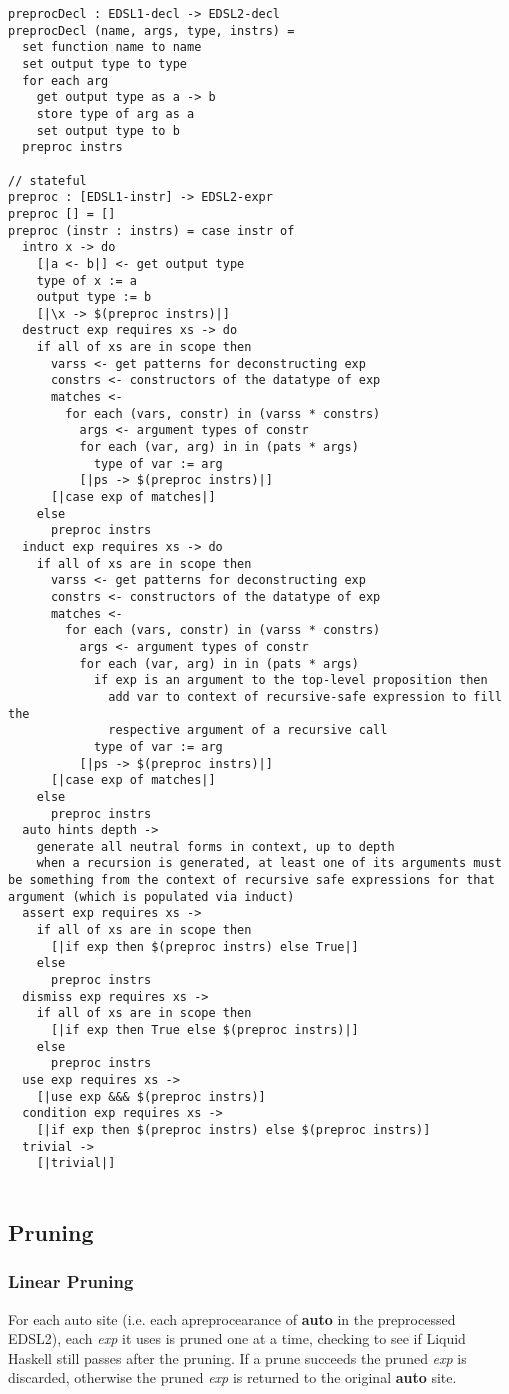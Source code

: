 \begin{verbatim}
preprocDecl : EDSL1-decl -> EDSL2-decl
preprocDecl (name, args, type, instrs) =
  set function name to name
  set output type to type
  for each arg
    get output type as a -> b 
    store type of arg as a
    set output type to b
  preproc instrs

// stateful
preproc : [EDSL1-instr] -> EDSL2-expr
preproc [] = []
preproc (instr : instrs) = case instr of 
  intro x -> do
    [|a <- b|] <- get output type
    type of x := a
    output type := b
    [|\x -> $(preproc instrs)|]
  destruct exp requires xs -> do
    if all of xs are in scope then 
      varss <- get patterns for deconstructing exp
      constrs <- constructors of the datatype of exp
      matches <- 
        for each (vars, constr) in (varss * constrs)
          args <- argument types of constr
          for each (var, arg) in in (pats * args)
            type of var := arg
          [|ps -> $(preproc instrs)|]
      [|case exp of matches|]
    else
      preproc instrs
  induct exp requires xs -> do
    if all of xs are in scope then 
      varss <- get patterns for deconstructing exp
      constrs <- constructors of the datatype of exp
      matches <-
        for each (vars, constr) in (varss * constrs)
          args <- argument types of constr
          for each (var, arg) in in (pats * args)
            if exp is an argument to the top-level proposition then
              add var to context of recursive-safe expression to fill the
              respective argument of a recursive call
            type of var := arg
          [|ps -> $(preproc instrs)|]
      [|case exp of matches|]
    else
      preproc instrs
  auto hints depth ->
    generate all neutral forms in context, up to depth
    when a recursion is generated, at least one of its arguments must be something from the context of recursive safe expressions for that argument (which is populated via induct)
  assert exp requires xs ->
    if all of xs are in scope then
      [|if exp then $(preproc instrs) else True|]
    else
      preproc instrs
  dismiss exp requires xs ->
    if all of xs are in scope then
      [|if exp then True else $(preproc instrs)|]
    else
      preproc instrs
  use exp requires xs -> 
    [|use exp &&& $(preproc instrs)]
  condition exp requires xs ->
    [|if exp then $(preproc instrs) else $(preproc instrs)]
  trivial ->
    [|trivial|]


\end{verbatim}

\subsection{Pruning}

\subsubsection{Linear Pruning}

For each auto site (i.e. each apreprocearance of \textbf{auto} in the preprocessed EDSL2), each \textit{exp} it uses is pruned one at a time, checking to see if Liquid Haskell still passes after the pruning. If a prune succeeds the pruned \textit{exp} is discarded, otherwise the pruned \textit{exp} is returned to the original \textbf{auto} site.
